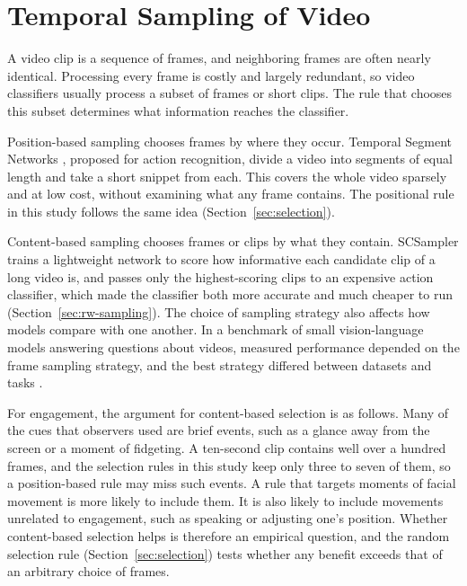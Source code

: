 
\section{Temporal Sampling of Video}
\label{sec:sampling}

A video clip is a sequence of frames, and neighboring frames are often nearly identical. Processing every frame is costly and largely redundant, so video classifiers usually process a subset of frames or short clips. The rule that chooses this subset determines what information reaches the classifier.

Position-based sampling chooses frames by where they occur. Temporal Segment Networks \cite{wang2016}, proposed for action recognition, divide a video into segments of equal length and take a short snippet from each. This covers the whole video sparsely and at low cost, without examining what any frame contains. The positional rule in this study follows the same idea (Section~\ref{sec:selection}).

Content-based sampling chooses frames or clips by what they contain. SCSampler \cite{korbar2019} trains a lightweight network to score how informative each candidate clip of a long video is, and passes only the highest-scoring clips to an expensive action classifier, which made the classifier both more accurate and much cheaper to run (Section~\ref{sec:rw-sampling}). The choice of sampling strategy also affects how models compare with one another. In a benchmark of small vision-language models answering questions about videos, measured performance depended on the frame sampling strategy, and the best strategy differed between datasets and tasks \cite{brkic2025}.

For engagement, the argument for content-based selection is as follows. Many of the cues that observers used are brief events, such as a glance away from the screen or a moment of fidgeting. A ten-second clip contains well over a hundred frames, and the selection rules in this study keep only three to seven of them, so a position-based rule may miss such events. A rule that targets moments of facial movement is more likely to include them. It is also likely to include movements unrelated to engagement, such as speaking or adjusting one's position. Whether content-based selection helps is therefore an empirical question, and the random selection rule (Section~\ref{sec:selection}) tests whether any benefit exceeds that of an arbitrary choice of frames.


